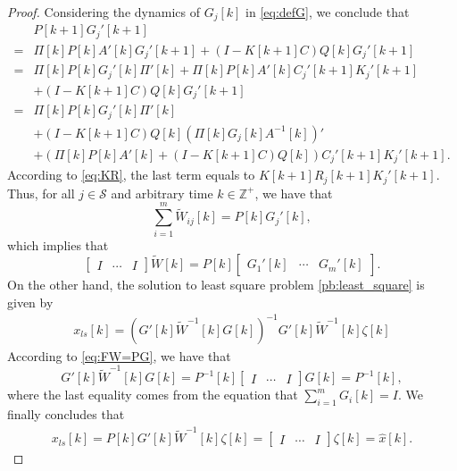 \documentclass[12pt]{article}
\newcommand{\Zb}{{\mathbb{Z}}}
\newcommand{\Ss}{{\mathscr{S}}}
\newtheorem*{proof}{\textbf{Proof}}
\begin{document}
\begin{proof}
Considering the dynamics of $G_j[k]$ in \eqref{eq:defG}, we conclude that
\begin{align*}
&P[k+1]G_j{'}[k+1]\\
=&\Pi[k]P[k]A{'}[k] G_j{'}[k+1]
 +\left(I-K[k+1]C\right)Q[k]G_j{'}[k+1] \\
=&\Pi[k]P[k] G_j{'}[k] \Pi{'}[k]+\Pi[k]P[k]A{'}[k] C_j{'}[k+1] K_j{'}[k+1]\\
&+\left(I-K[k+1]C\right)Q[k]G_j{'}[k+1]\\
=&\Pi[k]P[k] G_j{'}[k] \Pi{'}[k]\\
&+\left(I-K[k+1]C\right)Q[k]\left(\Pi[k] G_j[k] A^{-1}[k]\right){'}\\
&+\left(\Pi[k]P[k]A{'}[k]+\left(I-K[k+1]C\right)Q[k]\right)C_j{'}[k+1] K_j{'}[k+1].
\end{align*}
According to \eqref{eq:KR}, the last term equals to $K[k+1]R_j[k+1]K_j{'}[k+1]$.
Thus, for all $j\in\Ss$ and arbitrary time $k\in\Zb^+$, we have that
$$\sum_{i=1}^{m}  \tilde{W}_{i j}[k]=P[k] G_j{'}[k],$$
which implies that 
\begin{equation}\label{eq:FW=PG}
\begin{bmatrix}
	I & \cdots & I
\end{bmatrix} \tilde{W}[k]=P[k]\begin{bmatrix}
	G_{1}{'}[k] & \cdots & G_{m}{'}[k]
\end{bmatrix}.
\end{equation}
On the other hand, the solution to least square problem \eqref{pb:least_square} is given by 
\begin{align*}
x_{ls}[k]=\left(G{'}[k]\tilde{W}^{-1}[k]G[k]\right)^{-1} G{'}[k]\tilde{W}^{-1}[k]\zeta[k]
\end{align*}
According to \eqref{eq:FW=PG}, we have that
$$
G{'}[k]\tilde{W}^{-1}[k]G[k]=P^{-1}[k]\begin{bmatrix}
I & \cdots & I
\end{bmatrix}G[k]=P^{-1}[k],
$$
where the last equality comes from the equation that $\sum_{i=1}^{m}G_i[k]=I$. We finally concludes that
\begin{align*}
x_{ls}[k]=P[k]G{'}[k] \tilde{W}^{-1}[k]\zeta[k]=
\begin{bmatrix}
I& \cdots&  I
\end{bmatrix}\zeta[k]=\hat{x}[k].
\end{align*}

\end{proof}
\end{document}
